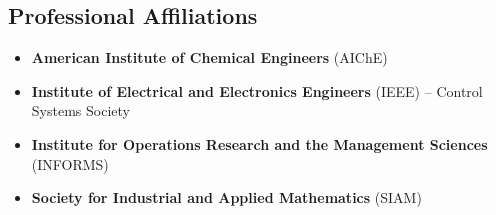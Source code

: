 \subsection*{Professional Affiliations}
\begin{itemize}[label=$\bullet$,itemsep=0pt]
\item \textbf{American Institute of Chemical Engineers} (AIChE)
\item \textbf{Institute of Electrical and Electronics Engineers} (IEEE) -- Control Systems Society
\item \textbf{Institute for Operations Research and the Management Sciences} (INFORMS)
\item \textbf{Society for Industrial and Applied Mathematics} (SIAM)
\end{itemize}
\let\OLDthebibliography\thebibliography
\renewcommand\thebibliography[1]{
  \OLDthebibliography{#1}
  \setlength{\parskip}{0pt}
  \setlength{\itemsep}{0pt}
}
